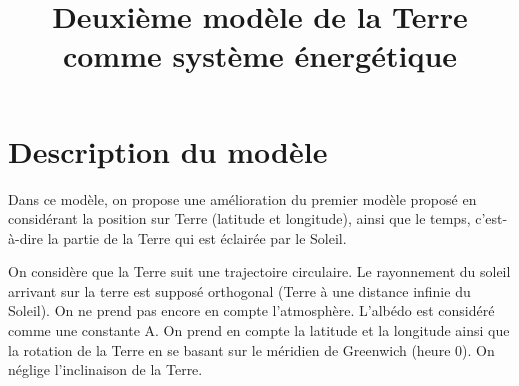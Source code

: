 \documentclass[a4paper,11pt]{article}
\title{Deuxième modèle de la Terre comme système énergétique}
\begin{document}
\maketitle

\section{Description du modèle}

Dans ce modèle, on propose une amélioration du premier modèle proposé en considérant la position sur Terre (latitude et longitude), ainsi que le temps, c'est-à-dire la partie de la Terre qui est éclairée par le Soleil.

On considère que la Terre suit une trajectoire circulaire. Le rayonnement du soleil arrivant sur la terre est supposé orthogonal (Terre à une distance infinie du Soleil). On ne prend pas encore en compte l'atmosphère. L'albédo est considéré comme une constante A. On prend en compte la latitude et la longitude ainsi que la rotation de la Terre en se basant sur le méridien de Greenwich (heure 0). On néglige l'inclinaison de la Terre.
\end{document}
